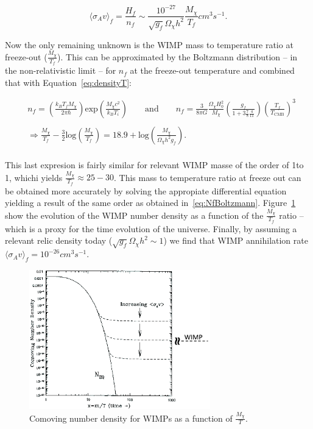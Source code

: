 \begin{equation}
\label{eq:RELICDENSITY}
\langle \sigma_{A}v\rangle_{f} = \frac{H_{f}}{n_{f}} \sim \frac{10^{-27}}{\sqrt{g_{f}}\Omega_{\chi}h^{2}}\frac{M_{\chi}}{T_{f}}\unit{cm}^{3}\unit{s}^{-1}.
\end{equation}

Now the only remaining unknown is the WIMP mass to temperature ratio
at freeze-out ($\frac{M_{\chi}}{T_{f}}$). This can be approximated by
the Boltzmann distribution -- in the non-relativistic limit --  for $n_{f}$ at the freeze-out temperature
and combined that with Equation~\ref{eq:densityT}:

\begin{equation}
\label{eq:NfBoltzmann}
\begin{aligned}
       &
n_{f} = \left(\frac{k_{B}T_{f}M_{\chi}}{2\pi
    \hbar}\right)\mathrm{exp}\left(\frac{M_{\chi}c^{2}}{k_{B}T_{i}}\right)
\qquad \text{and} \qquad n_{f} = \frac{3}{8\pi G}\frac{\Omega_{\chi}H^{2}_{0}}{M_{\chi}}\left(\frac{g_{f}}{1+3\frac{7}{8}\frac{4}{11}}\right)\left(\frac{T_{f}}{T_{\mathrm{CMB}}}\right)^{3}\\ \\
& \Rightarrow \frac{M_{\chi}}{T_{f}}
-\frac{3}{2}\mathrm{log}\left(\frac{M_{\chi}}{T_{f}}\right) = 18.9 +
\mathrm{log}\left(\frac{M_{\chi}}{\Omega_{\chi}h^{2}g_{f}}\right).\\
\end{aligned}
\end{equation}

This last expresion is fairly similar for relevant WIMP masse of the
order of 1\GeV to 1\TeV, whichi yields $\frac{M_{\chi}}{T_{f}} \approx
25-30$. This mass to temperature ratio at freeze out can be obtained
more accurately by solving the appropiate differential equation
yielding a result of the same order as obtained
in~\ref{eq:NfBoltzmann}. Figure~\ref{fig:freezeout} show the evolution
of the WIMP number density as a function of the
$\frac{M_{\chi}}{T_{f}}$ ratio -- which is a proxy for the time
evolution of the universe. Finally, by assuming a relevant relic
density today ($\sqrt{g_{f}}\Omega_{\chi}h^{2}\sim 1$) we find that
WIMP annihilation rate $\langle \sigma_{A}v\rangle_{f} =
10^{-26}\unit{cm}^{3}\unit{s}^{-1}$.
\begin{figure}
 \centering
\includegraphics[width=0.7\textwidth]{IntroFigures/freezeout.png}
\caption{Comoving number density for WIMPs as a function of $\frac{M_{\chi}}{T}$.\label{fig:freezeout}}
\end{figure}

